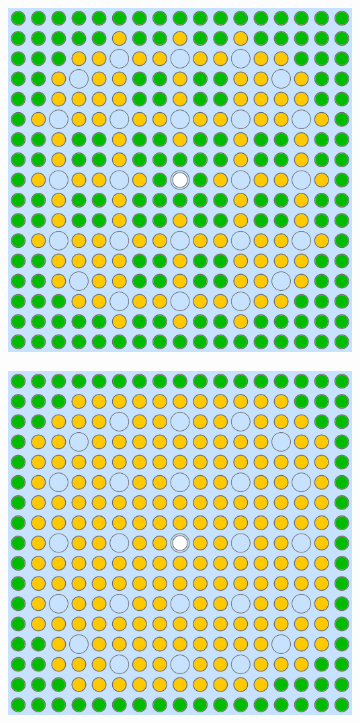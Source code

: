 \begin{figure}[h!]
\centering
\begin{subfigure}{0.47\textwidth}
  \centering
  \includegraphics[width=0.9\linewidth]{figures/unsupervised/geometries/with-features/2-clusters/pinch/assm-16}
  \caption{}
  \label{fig:chap10-assm-16-pinch-2}
\end{subfigure}%
\begin{subfigure}{0.47\textwidth}
  \centering
  \includegraphics[width=0.9\linewidth]{figures/unsupervised/geometries/with-features/2-clusters/combined/assm-16}

\end{subfigure}
\end{figure}
